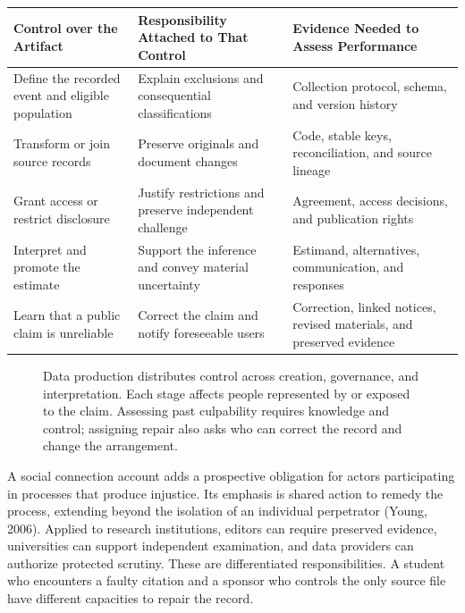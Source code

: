 \begin{table}[H]
\centering\small
\begin{tabular}{@{}
  >{\raggedright\arraybackslash}p{}
  >{\raggedright\arraybackslash}p{}
  >{\raggedright\arraybackslash}p{}@{}}
\toprule
Control over the Artifact & Responsibility Attached to That Control &
Evidence Needed to Assess Performance \\
\midrule

Define the recorded event and eligible population & Explain exclusions
and consequential classifications & Collection protocol, schema, and
version history \\
Transform or join source records & Preserve originals and document
changes & Code, stable keys, reconciliation, and source lineage \\
Grant access or restrict disclosure & Justify restrictions and preserve
independent challenge & Agreement, access decisions, and publication
rights \\
Interpret and promote the estimate & Support the inference and convey
material uncertainty & Estimand, alternatives, communication, and
responses \\
Learn that a public claim is unreliable & Correct the claim and notify
foreseeable users & Correction, linked notices, revised materials, and
preserved evidence \\
\bottomrule
\end{tabular}
\end{table}

\begin{figure}[htbp]
\centering

\caption{Data production distributes control across creation, governance, and interpretation. Each stage affects people represented by or exposed to the claim. Assessing past culpability requires knowledge and control; assigning repair also asks who can correct the record and change the arrangement.}\label{fig:M09_data_responsibility}
\end{figure}

A social connection account adds a prospective obligation for actors
participating in processes that produce injustice. Its emphasis is
shared action to remedy the process, extending beyond the isolation of
an individual perpetrator (Young, 2006). Applied to research
institutions, editors can require preserved evidence, universities can
support independent examination, and data providers can authorize
protected scrutiny. These are differentiated responsibilities. A student
who encounters a faulty citation and a sponsor who controls the only
source file have different capacities to repair the record.

